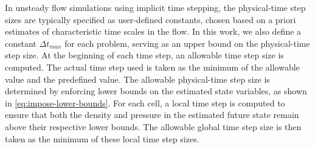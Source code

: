 In unsteady flow simulations using implicit time stepping, the physical-time step sizes are typically specified as user-defined constants, chosen based on a priori estimates of characteristic time scales in the flow. 
In this work, we also define a constant $\Delta t_{max}$ for each problem, serving as an upper bound on the physical-time step size. At the beginning of each time step, an allowable time step size is computed. The actual time step used is taken as the minimum of the allowable value and the predefined value.
The allowable physical-time step size is determined by enforcing lower bounds on the estimated state variables, as shown in \eqref{eq:impose-lower-bounds}. For each cell, a local time step is computed to ensure that both the density and pressure in the estimated future state remain above their respective lower bounds. The allowable global time step size is then taken as the minimum of these local time step sizes.


